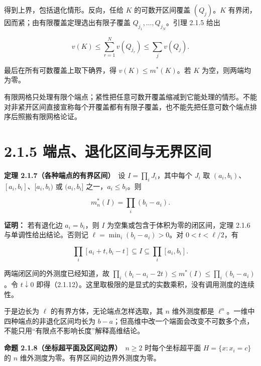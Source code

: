 \documentclass[11pt,a4paper]{article}
\begin{document}
得到上界，包括退化情形。反向，任给 \(K\) 的可数开区间覆盖
\((Q_j)\)。\(K\) 有界闭，因而紧；由有限覆盖定理选出有限子覆盖
\(Q_{j_1},\ldots,Q_{j_N}\)。引理 2.1.5 给出

\begin{equation*}
v(K)\le\sum_{r=1}^Nv(Q_{j_r})\le\sum_jv(Q_j).
\tag{2.1.11}
\end{equation*}

最后在所有可数覆盖上取下确界，得 \(v(K)\le m^*(K)\)。若 \(K\)
为空，则两端均为零。

有限网格只处理有限个端点；紧性把任意可数开覆盖缩减到它能处理的情形。不能对非紧开区间直接宣称每个开覆盖都有有限子覆盖，也不能先把任意可数个端点排序后照搬有限网格论证。

\section[\S{}2.1.5
端点、退化区间与无界区间]{2.1.5
端点、退化区间与无界区间}\label{ux7aefux70b9ux9000ux5316ux533aux95f4ux4e0eux65e0ux754cux533aux95f4}

\textbf{定理 2.1.7（各种端点的有界区间）}　设 \(I=\prod_iJ_i\)，其中每个
\(J_i\) 取 \((a_i,b_i)\)、\([a_i,b_i]\)、\([a_i,b_i)\) 或 \((a_i,b_i]\)
之一，\(a_i\le b_i\)。则

\begin{equation*}
m_n^*(I)=\prod_i(b_i-a_i).
\tag{2.1.12}
\end{equation*}

\textbf{证明：} 若有退化边 \(a_i=b_i\)，则 \(I\)
为空集或包含于体积为零的闭区间，定理 2.1.6 与单调性给出结论。否则记
\(\ell=\min_i(b_i-a_i)>0\)。对 \(0<t<\ell/2\)，有

\begin{equation*}
\prod_i[a_i+t,b_i-t]\subseteq I\subseteq\prod_i[a_i,b_i].
\tag{2.1.13}
\end{equation*}

两端闭区间的外测度已经知道，故
\(\prod_i(b_i-a_i-2t)\le m^*(I)\le\prod_i(b_i-a_i)\)。令
\(t\downarrow0\)
即得（2.1.12）。这里取极限的是显式的实数乘积，没有调用测度的连续性。

于是边长为 \(\ell\) 的有界方体，无论端点怎样选取，其 \(n\) 维外测度都是
\(\ell^n\)。一维中四种端点的非退化区间均长为
\(b-a\)；但高维中改一个端面会改变不可数多个点，不能只用``有限点不影响长度''解释高维结论。

\textbf{命题 2.1.8（坐标超平面及区间边界）}　\(n\ge2\) 时每个坐标超平面
\(H=\{x:x_i=c\}\) 的 \(n\) 维外测度为零。有界区间的边界外测度为零。
\end{document}

